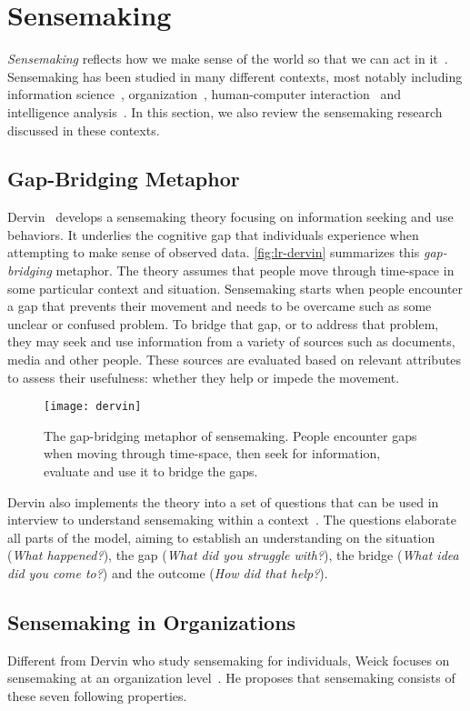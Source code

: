 \section{Sensemaking}
\emph{Sensemaking} reflects how we make sense of the world so that we can act in it~\cite{Snowden2005}. Sensemaking has been studied in many different contexts, most notably including information science~\cite{Dervin1983}, organization~\cite{Weick1995}, human-computer interaction~\cite{Russell1993} and intelligence analysis~\cite{Pirolli2005,Klein2003}. In this section, we also review the sensemaking research discussed in these contexts.

\subsection{Gap-Bridging Metaphor}
Dervin~\cite{Dervin1983} develops a sensemaking theory focusing on information seeking and use behaviors. It underlies the cognitive gap that individuals experience when attempting to make sense of observed data. \autoref{fig:lr-dervin} summarizes this \emph{gap-bridging} metaphor. The theory assumes that people move through time-space in some particular context and situation. Sensemaking starts when people encounter a gap that prevents their movement and needs to be overcame such as some unclear or confused problem. To bridge that gap, or to address that problem, they may seek and use information from a variety of sources such as documents, media and other people. These sources are evaluated based on relevant attributes to assess their usefulness: whether they help or impede the movement.

\begin{figure}[!htb]
	\centering
	\texttt{[image: dervin]}
	\caption{The gap-bridging metaphor of sensemaking. People encounter gaps when moving through time-space, then seek for information, evaluate and use it to bridge the gaps. }
	\label{fig:lr-dervin}
\end{figure}

Dervin also implements the theory into a set of questions that can be used in interview to understand sensemaking within a context~\cite{Dervin1983}. The questions elaborate all parts of the model, aiming to establish an understanding on the situation (\emph{What happened?}), the gap (\emph{What did you struggle with?}), the bridge (\emph{What idea did you come to?}) and the outcome (\emph{How did that help?}).

\subsection{Sensemaking in Organizations}
Different from Dervin who study sensemaking for individuals, Weick focuses on sensemaking at an organization level~\cite{Weick1995}. He proposes that sensemaking consists of these seven following properties.

